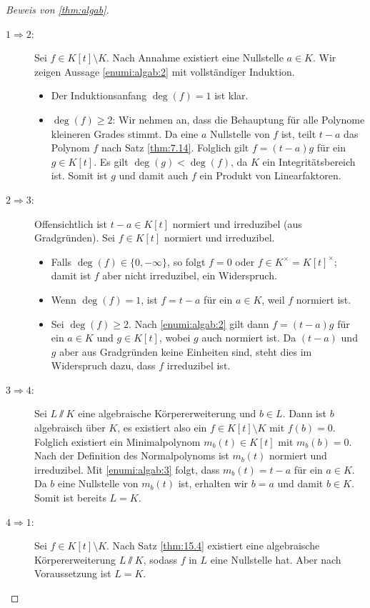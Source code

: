\documentclass[12pt,a4paper]{scrartcl}
\begin{document}
\begin{proof}[Beweis von \cref{thm:algab}]
	\leavevmode
	\begin{description}
		\item[\glqq$1\Rightarrow2$\grqq:] Sei $f \in K[t]\setminus K$. Nach Annahme existiert eine Nullstelle $a \in K$. Wir zeigen Aussage \ref{enumi:algab:2} mit vollständiger Induktion.
		\begin{itemize}
			\item Der Induktionsanfang $\deg(f) = 1$ ist klar.
			\item $\deg(f)\geq 2$: Wir nehmen an, dass die Behauptung für alle Polynome kleineren Grades stimmt. Da eine $a$ Nullstelle von $f$ ist, teilt $t-a$ das Polynom $f$ nach Satz \ref{thm:7.14}.
			Folglich gilt $f = (t-a)g$ für ein $g\in K[t]$. Es gilt $\deg(g)<\deg(f)$, da $K$ ein Integritätsbereich ist. Somit ist $g$ und damit auch $f$ ein Produkt von Linearfaktoren.
		\end{itemize}
		\item[\glqq$2\Rightarrow 3$\grqq:] Offensichtlich ist $t-a\in K[t]$ normiert und irreduzibel (aus Gradgründen). Sei $f\in K[t]$ normiert und irreduzibel.
		\begin{itemize}
			\item Falls $\deg(f) \in\{0,-\infty\}$, so folgt $f=0$ oder $f\in K^{\times} = K[t]^{\times}$; damit ist $f$ aber nicht irreduzibel, ein Widerspruch.
			\item Wenn $\deg(f) = 1$, ist $f = t-a$ für ein $a\in K$, weil $f$ normiert ist.
			\item Sei $\deg (f)\geq 2$. Nach \ref{enumi:algab:2} gilt dann $f = (t-a)g$ für ein $a\in K$ und $g\in K[t]$, wobei $g$ auch normiert ist. Da $(t-a)$ und $g$ aber aus Gradgründen keine Einheiten sind, steht dies im Widerspruch dazu, dass $f$ irreduzibel ist.
		\end{itemize}
		\item[\glqq$3\Rightarrow 4$\grqq:] Sei $L\sslash K$ eine algebraische Körpererweiterung und $b\in L$. Dann ist $b$ algebraisch über $K$, es existiert also ein $f\in K[t]\setminus K$ mit $f(b) = 0$. Folglich existiert ein Minimalpolynom $m_b(t)\in K[t]$ mit $m_b(b)= 0$. Nach der Definition des Normalpolynoms ist $m_b(t)$ normiert und irreduzibel. Mit \ref{enumi:algab:3} folgt, dass $m_b(t) = t-a$ für ein $a\in K$. Da $b$ eine Nullstelle von $m_b(t)$ ist, erhalten wir $b = a$ und damit $b\in K$. Somit ist bereits $L = K$.
		\item[\glqq$4\Rightarrow1$\grqq:] Sei $f\in K[t]\setminus K$. Nach Satz \ref{thm:15.4} existiert eine algebraische Körpererweiterung $L\sslash K$, sodass $f$ in $L$ eine Nullstelle hat. Aber nach Voraussetzung ist $L = K$. 
	\end{description}
\end{proof}
	
\end{document}
